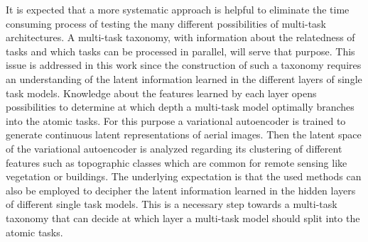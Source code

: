 It is expected that a more systematic approach is helpful to eliminate the time consuming process of testing 
the many different possibilities of multi-task architectures. A multi-task taxonomy, with information about
the relatedness of tasks and which tasks can be processed in parallel, will serve that purpose.
This issue is addressed in this work since the construction of such a taxonomy requires an understanding
of the latent information learned in the different layers of single task models. Knowledge about the
features learned by each layer
opens possibilities to determine at which depth a multi-task model optimally branches
into the atomic tasks. 
For this purpose a variational autoencoder is trained to generate continuous latent representations of aerial images.
Then the latent space of the variational autoencoder is analyzed regarding its clustering of different
features such as topographic classes which are common for remote sensing like vegetation or buildings.
The underlying expectation is that the used methods can also be
employed to decipher the latent information learned in the hidden layers of different single task models. 
This is a necessary step towards a multi-task taxonomy that can decide at which layer a multi-task model
should split into the atomic tasks.